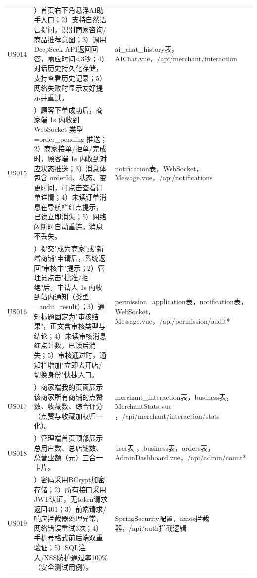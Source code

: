 \begin{levellist}
\begin{levellist}
\begin{longtable}{>{\centering\arraybackslash}m{2.3cm} >{\centering\arraybackslash}m{7.5cm} >{\centering\arraybackslash}m{4cm}}
            US014           & 1）首页右下角悬浮AI助手入口；2）支持自然语言提问，识别商家咨询/商品推荐意图；3）调用DeepSeek API返回回答，响应时间\textless{}3秒；4）对话历史持久化存储，支持查看历史记录；5）网络失败时显示友好提示并重试。                                          & ai\_chat\_history表，AIChat.vue，/api/merchant/interaction                             \\
            US015           & 1）顾客下单成功后，商家端 1s 内收到 WebSocket 类型=order\_pending 推送；2）商家接单/拒单/完成时，顾客端 1s 内收到对应状态推送；3）消息体包含 orderId、状态、变更时间，可点击查看订单详情；4）未读订单消息在导航栏红点提示，已读立即消失；5）网络闪断时自动重连，消息不丢失。 & notification表，WebSocket，Message.vue，/api/notifications                              \\
            US016           & 1）提交"成为商家"或"新增商铺"申请后，系统返回"审核中"提示；2）管理员点击"批准/拒绝"后，申请人 1s 内收到站内通知（类型=audit\_result）；3）通知标题固定为"审核结果"，正文含审核类型与结论；4）未读审核消息红点计数，已读后消失；5）审核通过时，通知栏增加"立即去开店/切换身份"快捷入口。  & permission\_application表，notification表，WebSocket，Message.vue，/api/permission/audit* \\
            US017           & 1）商家端我的页面展示该商家所有商铺的点赞数、收藏数、综合评分（点赞与收藏加权归一化）。                                                                                                                    & merchant\_interaction表，business表，MerchantStats.vue ，/api/merchant/interaction/stats \\
            US018           & 1）管理端首页顶部展示总用户数、总店铺数、总营业额（元）三合一卡片。                                                                                                                              & user表 ，business表，orders表，AdminDashboard.vue，/api/admin/count*                       \\
            US019           & 1）密码采用BCrypt加密存储；2）所有接口采用JWT认证，无token请求返回401；3）前端请求/响应拦截器处理异常，网络错误重试3次；4）手机号格式前后端双重验证；5）SQL注入/XSS防护通过率100\%（安全测试用例）。                                            & SpringSecurity配置，axios拦截器，/api/auth拦截逻辑                                             \\
        \end{longtable}



    \end{levellist}


\end{levellist}
